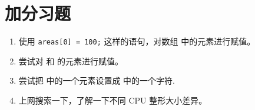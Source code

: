 \section{加分习题}

\begin{enumerate}
\item 使用 \verb|areas[0] = 100;| 这样的语句，对数组  中的元素进行赋值。
\item 尝试对  和  的元素进行赋值。
\item 尝试把  中的一个元素设置成  中的一个字符.
\item 上网搜索一下，了解一下不同 CPU 整形大小差异。
\end{enumerate}

